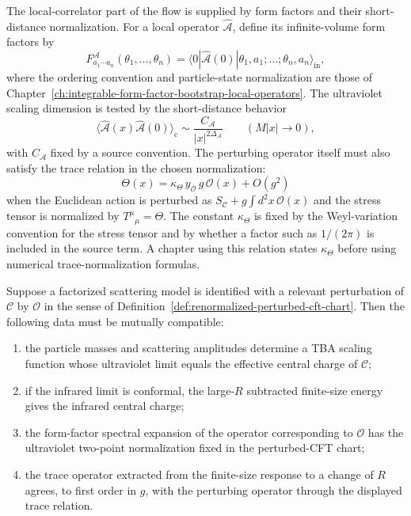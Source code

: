 The local-correlator part of the flow is supplied by form factors and their
short-distance normalization.  For a local operator
\(\widehat{\mathcal A}\), define its infinite-volume form factors by
\[
  F^{\mathcal A}_{a_1\cdots a_n}(\theta_1,\ldots,\theta_n)
  =
  \langle 0|\widehat{\mathcal A}(0)|
  \theta_1,a_1;\ldots;\theta_n,a_n\rangle_{\mathrm{in}},
\]
where the ordering convention and particle-state normalization are those of
Chapter~\ref{ch:integrable-form-factor-bootstrap-local-operators}.  The
ultraviolet scaling dimension is tested by the short-distance behavior
\[
  \langle \widehat{\mathcal A}(x)\widehat{\mathcal A}(0)\rangle_{\mathrm c}
  \sim
  \frac{C_{\mathcal A}}{|x|^{2\Delta_{\mathcal A}}}
  \qquad (M|x|\to0),
\]
with \(C_{\mathcal A}\) fixed by a source convention.  The perturbing operator
itself must also satisfy the trace relation in the chosen normalization:
\[
  \Theta(x)
  =
  \kappa_\Theta\,y_{\mathcal O}\,g\,\mathcal O(x)
  +O(g^2)
\]
when the Euclidean action is perturbed as
\(S_{\mathcal C}+g\int d^2x\,\mathcal O(x)\) and the stress tensor is
normalized by \(T^\mu{}_\mu=\Theta\).  The constant \(\kappa_\Theta\) is fixed
by the Weyl-variation convention for the stress tensor and by whether a factor
such as \(1/(2\pi)\) is included in the source term.  A chapter using this
relation states \(\kappa_\Theta\) before using numerical trace-normalization
formulas.

\begin{remark}
\label{rem:necessary-integrable-flow-matching}
Suppose a factorized scattering model is identified with a relevant
perturbation of \(\mathcal C\) by \(\mathcal O\) in the sense of
Definition~\ref{def:renormalized-perturbed-cft-chart}.  Then the following
data must be mutually compatible:
\begin{enumerate}
\item the particle masses and scattering amplitudes determine a TBA scaling
function whose ultraviolet limit equals the effective central charge of
\(\mathcal C\);
\item if the infrared limit is conformal, the large-\(R\) subtracted
finite-size energy gives the infrared central charge;
\item the form-factor spectral expansion of the operator corresponding to
\(\mathcal O\) has the ultraviolet two-point normalization fixed in the
perturbed-CFT chart;
\item the trace operator extracted from the finite-size response to a change
of \(R\) agrees, to first order in \(g\), with the perturbing operator through
the displayed trace relation.
\end{enumerate}
\end{remark}

